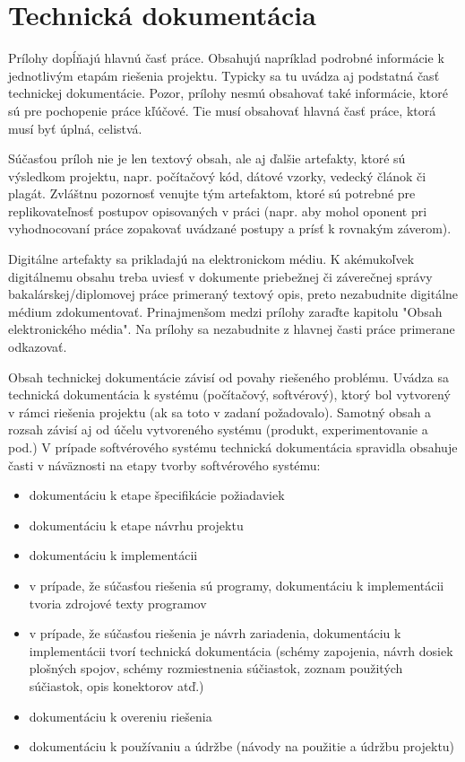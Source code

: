 \setcounter{figure}{0}
\chapter{Technická dokumentácia}
\renewcommand*{\thepage}{A-\arabic{page}}

Prílohy dopĺňajú hlavnú časť práce. Obsahujú napríklad podrobné informácie k jednotlivým
etapám riešenia projektu. Typicky sa tu uvádza aj podstatná časť technickej dokumentácie.
Pozor, prílohy nesmú obsahovať také informácie, ktoré sú pre pochopenie práce kľúčové. Tie
musí obsahovať hlavná časť práce, ktorá musí byť úplná, celistvá.

Súčasťou príloh nie je len textový obsah, ale aj ďalšie artefakty, ktoré sú výsledkom projektu,
napr. počítačový kód, dátové vzorky, vedecký článok či plagát. Zvláštnu pozornosť venujte tým
artefaktom, ktoré sú potrebné pre replikovateľnosť postupov opisovaných v práci (napr. aby
mohol oponent pri vyhodnocovaní práce zopakovať uvádzané postupy a prísť k rovnakým
záverom). 

Digitálne artefakty sa prikladajú na elektronickom médiu. K akémukoľvek
digitálnemu obsahu treba uviesť v dokumente priebežnej či záverečnej správy
bakalárskej/diplomovej práce primeraný textový opis, preto nezabudnite digitálne médium
zdokumentovať. Prinajmenšom medzi prílohy zaraďte kapitolu "Obsah elektronického média".
Na prílohy sa nezabudnite z hlavnej časti práce primerane odkazovať.

Obsah technickej dokumentácie závisí od povahy riešeného problému. Uvádza sa technická dokumentácia k systému (počítačový, softvérový), ktorý bol vytvorený v rámci riešenia projektu (ak sa toto v zadaní požadovalo). Samotný obsah a rozsah závisí aj od účelu vytvoreného systému (produkt, experimentovanie a pod.)
V prípade softvérového systému technická dokumentácia spravidla obsahuje časti v náväznosti na etapy tvorby softvérového systému:
\begin{itemize}
	\item dokumentáciu k etape špecifikácie požiadaviek
    \item dokumentáciu k etape návrhu projektu
    \item dokumentáciu k implementácii
    \item v prípade, že súčasťou riešenia sú programy, dokumentáciu k implementácii tvoria zdrojové texty programov
    \item v prípade, že súčasťou riešenia je návrh zariadenia, dokumentáciu k implementácii tvorí technická dokumentácia (schémy zapojenia, návrh dosiek plošných spojov, schémy rozmiestnenia súčiastok, zoznam použitých súčiastok, opis konektorov atď.)
    \item dokumentáciu k overeniu riešenia
    \item dokumentáciu k používaniu a údržbe (návody na použitie a údržbu projektu)
\end{itemize}
 
